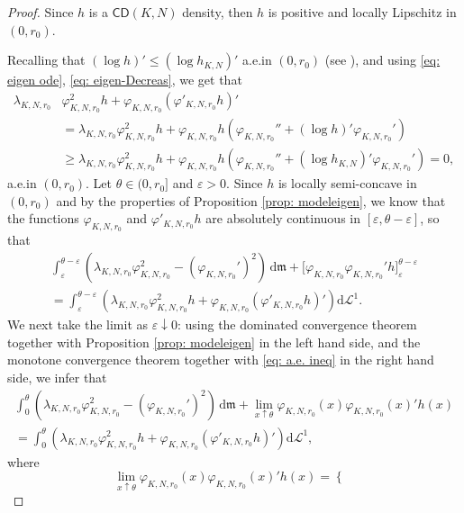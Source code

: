 \documentclass[12pt]{article}
\newcommand{\dd}{\mathrm{d}}
\newcommand{\mm}{\mathfrak m}
\theoremstyle{plain}
\theoremstyle{definition}
\begin{document}
\begin{proof}
Since $h$ is a $\mathsf{CD}(K,N)$ density, then $h$ is positive and locally Lipschitz in $(0,r_0)$.

Recalling that $(\log{h})'\le (\log{h_{K,N}})'$ a.e.\;in $(0,r_0)$ (see \cite[Lemma A.9]{CaMi}),  and using \eqref{eq: eigen ode}, \eqref{eq: eigen-Decreas}, we get that 
\begin{equation}\label{eq: a.e. ineq}
\begin{aligned}
\lambda_{K,N,r_0}&\varphi^2_{K,N,r_0}h+\varphi_{K,N,r_0}(\varphi'_{K,N,r_0}h)'\\
&=\lambda_{K,N,r_0}\varphi^2_{K,N,r_0}h+\varphi_{K,N,r_0}h(\varphi_{K,N,r_0}''+(\log{h})'\varphi_{K,N,r_0}')\\
&\ge\lambda_{K,N,r_0}\varphi^2_{K,N,r_0}h+\varphi_{K,N,r_0}h(\varphi_{K,N,r_0}''+(\log{h_{K,N}})'\varphi_{K,N,r_0}')=0,
\end{aligned}
\end{equation}
 a.e.\;in  $(0,r_0)$.  Let $\theta\in (0,r_0]$ and $\varepsilon>0$. Since $h$ is locally semi-concave in $(0,r_0)$ and by the properties of Proposition \ref{prop: modeleigen}, we know that the functions $\varphi_{K,N,r_0}$ and $\varphi'_{K,N,r_0}h$ are absolutely continuous in $[\varepsilon,\theta-\varepsilon]$, so that 
\begin{align*}\int_{\varepsilon}^{\theta-\varepsilon}\left(\lambda_{K,N,r_0}\varphi^2_{K,N,r_0}-(\varphi_{K,N,r_0}')^2\right)\,\dd \mm+\Big[\varphi_{K,N,r_0}\varphi_{K,N,r_0}'h\Big]^{\theta-\varepsilon}_{\varepsilon}\\
=\int_{\varepsilon}^{\theta-\varepsilon}\left(\lambda_{K,N,r_0}\varphi^2_{K,N,r_0}h+\varphi_{K,N,r_0}(\varphi'_{K,N,r_0}h)'\right)\dd\mathcal{L}^1.
\end{align*}
We next take the limit as $\varepsilon\downarrow0$: using the dominated convergence theorem together with Proposition \ref{prop: modeleigen} in the left hand side, and the monotone convergence theorem together with \eqref{eq: a.e. ineq} in the right hand side, we infer that
\begin{align*}\int_{0}^{\theta}\left(\lambda_{K,N,r_0}\varphi^2_{K,N,r_0}-(\varphi_{K,N,r_0}')^2\right)\,\dd \mm+\lim_{x\uparrow \theta}\varphi_{K,N,r_0}(x)\varphi_{K,N,r_0}(x)'h(x)\\
=\int_{0}^{\theta}\left(\lambda_{K,N,r_0}\varphi^2_{K,N,r_0}h+\varphi_{K,N,r_0}(\varphi'_{K,N,r_0}h)'\right)\dd\mathcal{L}^1,
\end{align*}
where 
\[
\lim_{x\uparrow \theta}\varphi_{K,N,r_0}(x)\varphi_{K,N,r_0}(x)'h(x)=\begin{cases}

\end{cases}\]
\end{proof}
\end{document}
